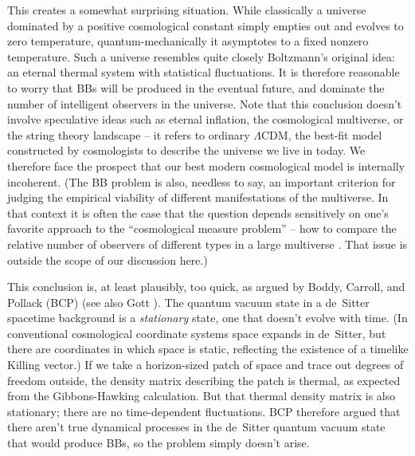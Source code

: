 \documentclass[12pt,letterpaper]{article}
\begin{document}
This creates a somewhat surprising situation.
While classically a universe dominated by a positive cosmological constant simply empties out and evolves to zero temperature, quantum-mechanically it asymptotes to a fixed nonzero temperature.
Such a universe resembles quite closely Boltzmann's original idea: an eternal thermal system with statistical fluctuations.
It is therefore reasonable to worry that BBs will be produced in the eventual future, and dominate the number of intelligent observers in the universe.
Note that this conclusion doesn't involve speculative ideas such as eternal inflation, the cosmological multiverse, or the string theory landscape -- it refers to ordinary $\Lambda$CDM, the best-fit model constructed by cosmologists to describe the universe we live in today.
We therefore face the prospect that our best modern cosmological model is internally incoherent.
(The BB problem is also, needless to say, an important criterion for judging the empirical viability of different manifestations of the multiverse.
In that context it is often the case that the question depends sensitively on one's favorite approach to the ``cosmological measure problem'' -- how to compare the relative number of observers of different types in a large multiverse \cite{Bousso:2006ev,Bousso:2006xc,Linde:2006nw,Vilenkin:2006qg,Garriga:2007wz,Bousso:2007nd,DeSimone:2008if,Freivogel:2011eg,Salem:2011qz,Vilenkin:2011yx}.
That issue is outside the scope of our discussion here.)

This conclusion is, at least plausibly, too quick, as argued by Boddy, Carroll, and Pollack (BCP) \cite{Boddy:2014eba} (see also Gott \cite{Gott:2008ii}).
The quantum vacuum state in a de~Sitter spacetime background is a \emph{stationary} state, one that doesn't evolve with time.
(In conventional cosmological coordinate systems space expands in de~Sitter, but there are coordinates in which space is static, reflecting the existence of a timelike Killing vector.)
If we take a horizon-sized patch of space and trace out degrees of freedom outside, the density matrix describing the patch is thermal, as expected from the Gibbons-Hawking calculation.
But that thermal density matrix is also stationary; there are no time-dependent fluctuations.
BCP therefore argued that there aren't true dynamical processes in the de~Sitter quantum vacuum state that would produce BBs, so the problem simply doesn't arise.
\end{document}

